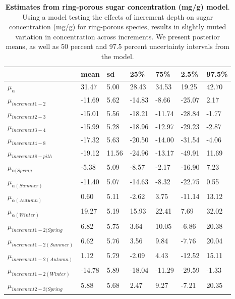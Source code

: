 \documentclass{article}\usepackage[]{graphicx}\usepackage[]{color}
\begin{document}
\begin{table}[ht]
\centering
\caption{\textbf{Estimates from ring-porous sugar concentration (mg/g) model}. Using a model testing the effects of increment depth on sugar concentration (mg/g) for ring-porous species, results in slightly muted variation in concentration across increments. We present posterior means, as well as 50 percent and 97.5 percent uncertainty intervals from the model.} 
\label{tab:ringsug}
\begingroup\footnotesize
\begin{tabular}{|p{}|p{}|p{}|p{}|p{}|p{}|p{}|}
  \hline
 & mean & sd & 25\% & 75\% & 2.5\% & 97.5\% \\ 
  \hline
$\mu_{\alpha}$ & 31.47 & 5.00 & 28.43 & 34.53 & 19.25 & 42.70 \\ 
  $\mu_{increment 1-2}$ & -11.69 & 5.62 & -14.83 & -8.66 & -25.07 & 2.17 \\ 
  $\mu_{increment 2-3}$ & -15.01 & 5.56 & -18.21 & -11.74 & -28.84 & -1.77 \\ 
  $\mu_{increment 3-4}$ & -15.99 & 5.28 & -18.96 & -12.97 & -29.23 & -2.87 \\ 
  $\mu_{increment 4-8}$ & -17.32 & 5.63 & -20.50 & -14.00 & -31.54 & -4.06 \\ 
  $\mu_{increment 8-pith}$ & -19.12 & 11.56 & -24.96 & -13.17 & -49.91 & 11.69 \\ 
  $\mu_{\alpha (Spring}$ & -5.38 & 5.09 & -8.57 & -2.17 & -16.90 & 7.23 \\ 
  $\mu_{\alpha (Summer)}$ & -11.40 & 5.07 & -14.63 & -8.32 & -22.75 & 0.55 \\ 
  $\mu_{\alpha (Autumn)}$ & 0.60 & 5.11 & -2.62 & 3.75 & -11.14 & 13.12 \\ 
  $\mu_{\alpha (Winter)}$ & 19.27 & 5.19 & 15.93 & 22.41 & 7.69 & 32.02 \\ 
  $\mu_{increment 1-2 (Spring}$ & 6.82 & 5.75 & 3.64 & 10.05 & -6.86 & 20.38 \\ 
  $\mu_{increment 1-2 (Summer)}$ & 6.62 & 5.76 & 3.56 & 9.84 & -7.76 & 20.04 \\ 
  $\mu_{increment 1-2 (Autumn)}$ & 1.12 & 5.79 & -2.09 & 4.43 & -12.52 & 15.11 \\ 
  $\mu_{increment 1-2 (Winter)}$ & -14.78 & 5.89 & -18.04 & -11.29 & -29.59 & -1.33 \\ 
  $\mu_{increment 2-3 (Spring}$ & 5.88 & 5.68 & 2.47 & 9.27 & -7.21 & 20.35 \\ 

\end{tabular}
\end{table}
\end{document}
